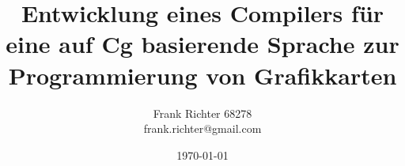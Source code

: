 \documentclass[twoside,a4paper,fleqn,12pt]{book}
\author{Frank Richter 68278\\frank.richter@gmail.com}
\title{\usefont{OT1}{phv}{b}{n}\selectfont Entwicklung eines Compilers für eine auf Cg basierende Sprache zur Programmierung von Grafikkarten \normalfont}
\date{\today}
\begin{document}
\sloppy

\newcommand\btxandlong{und}
\newcommand\btxandshort{u}
\newcommand\Btxinlong{In}
\newcommand\Btxinshort{I}
\newcommand\btxpageslong{Seiten}
\newcommand\btxetalshort{et al}
\newcommand\btxeditionlong{Auflage}


\renewcommand{\baselinestretch}{1.50}\normalsize


\newcommand{\captionstyle}{\small\centering}

\makeatletter  %
\long\def\@makecaption#1#2{%
  \vskip\abovecaptionskip
  \sbox\@tempboxa{{\captionstyle #1: #2}}%
  \ifdim \wd\@tempboxa >\hsize
    {\captionstyle #1: #2\par}
  \else
    \hbox to\hsize{\hfil\box\@tempboxa\hfil}%
  \fi
  \vskip\belowcaptionskip}
\makeatother   %

\makeatletter
\newlength{\myFootnoteWidth}
\newlength{\myFootnoteLabel}
\setlength{\myFootnoteLabel}{1.2em}%
\renewcommand{\@makefntext}[1]{%
  \setlength{\myFootnoteWidth}{\columnwidth}%
  \addtolength{\myFootnoteWidth}{-\myFootnoteLabel}%
  \noindent\makebox[\myFootnoteLabel][r]{\@makefnmark\ }%
  \parbox[t]{\myFootnoteWidth}{#1}%
}
\makeatother

\titlepage
\maketitle
\thispagestyle{empty}
\newpage
\thispagestyle{empty}
\mbox{}

\fancyhead[L]{}
\fancyhead[R]{}
\fancyfoot[C]{\today}
\fancyfoot[R]{\footnotesize \thepage{}}
\renewcommand{\headrulewidth}{0pt}


\newpage
{}
\tableofcontents

\cleardoublepage
{}
\newcommand\todo[1]{\footnote{\textcolor{red}{TODO: #1}}}
\newcommand\fcite[1]{\footnote{\cite{#1}}}
\newcommand\fciteX[2]{\footnote{\cite{#1}, #2}}
\end{document}

